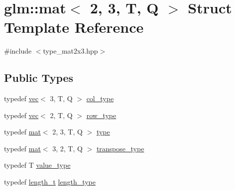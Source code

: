 \hypertarget{structglm_1_1mat_3_012_00_013_00_01_t_00_01_q_01_4}{}\section{glm\+:\+:mat$<$ 2, 3, T, Q $>$ Struct Template Reference}
\label{structglm_1_1mat_3_012_00_013_00_01_t_00_01_q_01_4}


{\ttfamily \#include $<$type\+\_\+mat2x3.\+hpp$>$}

\subsection*{Public Types}
\begin{DoxyCompactItemize}
\item 
typedef \mbox{\hyperlink{structglm_1_1vec}{vec}}$<$ 3, T, Q $>$ \mbox{\hyperlink{structglm_1_1mat_3_012_00_013_00_01_t_00_01_q_01_4_aebe4faf14ea1bc3092b4bbf591d7194e}{col\+\_\+type}}
\item 
typedef \mbox{\hyperlink{structglm_1_1vec}{vec}}$<$ 2, T, Q $>$ \mbox{\hyperlink{structglm_1_1mat_3_012_00_013_00_01_t_00_01_q_01_4_a94cb8478500cfb7249eadf766b9e64f1}{row\+\_\+type}}
\item 
typedef \mbox{\hyperlink{structglm_1_1mat}{mat}}$<$ 2, 3, T, Q $>$ \mbox{\hyperlink{structglm_1_1mat_3_012_00_013_00_01_t_00_01_q_01_4_a8a283bdf36e731e243e185a5dc783070}{type}}
\item 
typedef \mbox{\hyperlink{structglm_1_1mat}{mat}}$<$ 3, 2, T, Q $>$ \mbox{\hyperlink{structglm_1_1mat_3_012_00_013_00_01_t_00_01_q_01_4_a5e827ce80d430334f2815fa8eb6aeb06}{transpose\+\_\+type}}
\item 
typedef T \mbox{\hyperlink{structglm_1_1mat_3_012_00_013_00_01_t_00_01_q_01_4_a16f6111e5e9f3d29da5926277e63f668}{value\+\_\+type}}
\item 
typedef \mbox{\hyperlink{namespaceglm_a090a0de2260835bee80e71a702492ed9}{length\+\_\+t}} \mbox{\hyperlink{structglm_1_1mat_3_012_00_013_00_01_t_00_01_q_01_4_ad2e2433ba375abcd6bada873f8ea2de1}{length\+\_\+type}}
\end{DoxyCompactItemize}
